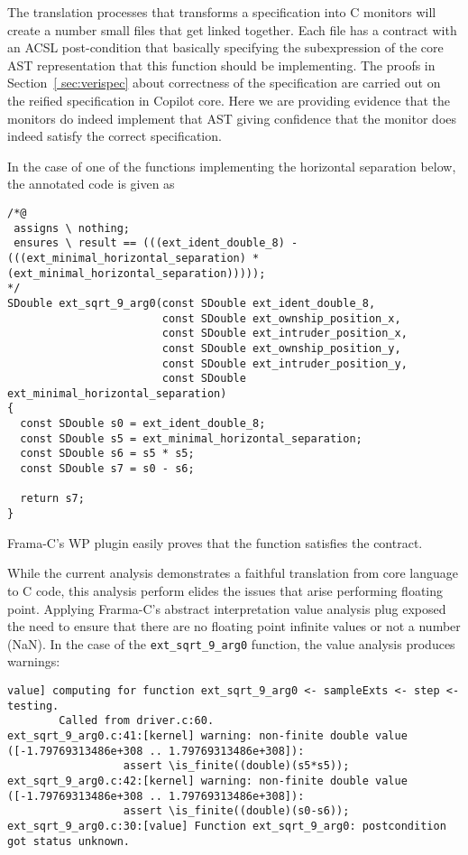 The translation processes that transforms  a specification  into C monitors will create a number small files
that get linked together. Each file has a contract  with an ACSL 
post-condition that basically specifying the subexpression of the core
AST representation that this function should be  implementing. 
The proofs in Section~\ref{ sec:verispec}  about correctness of the
specification are carried out on the reified specification in Copilot
core. Here we are providing evidence that the monitors do indeed
implement that AST giving confidence that the monitor does indeed
satisfy the correct specification. 

In the case of one of the functions implementing
the horizontal separation below, the annotated code is given as 

\begin{verbatim}
/*@
 assigns \ nothing;
 ensures \ result == (((ext_ident_double_8) - (((ext_minimal_horizontal_separation) * (ext_minimal_horizontal_separation)))));
*/
SDouble ext_sqrt_9_arg0(const SDouble ext_ident_double_8,
                        const SDouble ext_ownship_position_x,
                        const SDouble ext_intruder_position_x,
                        const SDouble ext_ownship_position_y,
                        const SDouble ext_intruder_position_y,
                        const SDouble ext_minimal_horizontal_separation)
{
  const SDouble s0 = ext_ident_double_8;
  const SDouble s5 = ext_minimal_horizontal_separation;
  const SDouble s6 = s5 * s5;
  const SDouble s7 = s0 - s6;

  return s7;
}
\end{verbatim}

\noindent
Frama-C's WP plugin easily proves that the function satisfies the
contract. 

While the current analysis demonstrates a faithful translation from
core language to C code, this analysis perform elides the issues that
arise performing floating point. Applying Frarma-C's abstract
interpretation value analysis plug exposed the need to ensure that
there are no floating point infinite values  or not a number (NaN).
In the case of the \texttt{ext\_sqrt\_9\_arg0} function, the value
analysis produces warnings:
\begin{verbatim}
value] computing for function ext_sqrt_9_arg0 <- sampleExts <- step <- testing.
        Called from driver.c:60.
ext_sqrt_9_arg0.c:41:[kernel] warning: non-finite double value ([-1.79769313486e+308 .. 1.79769313486e+308]):
                  assert \is_finite((double)(s5*s5));
ext_sqrt_9_arg0.c:42:[kernel] warning: non-finite double value ([-1.79769313486e+308 .. 1.79769313486e+308]):
                  assert \is_finite((double)(s0-s6));
ext_sqrt_9_arg0.c:30:[value] Function ext_sqrt_9_arg0: postcondition got status unknown.
\end{verbatim}


